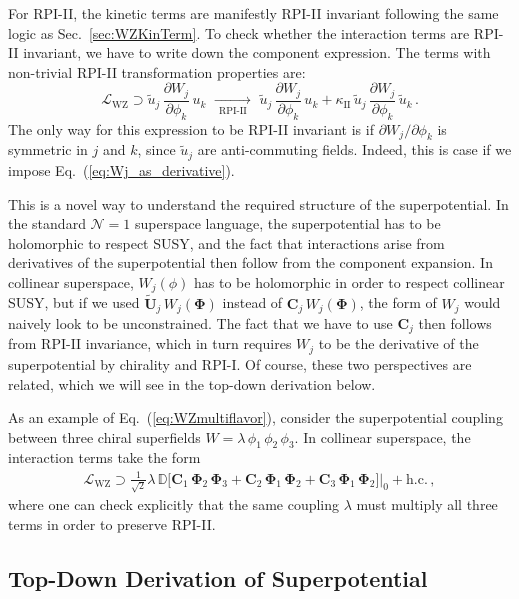 \documentclass[12pt,document,nofootinbib,superscriptaddress,onecolumn,preprintnumbers,balancelastpage]{article}
\newcommand{\rpiii}{{\kappa_\text{II}}}
\newcommand{\RPIii}{\,\,\xrightarrow[\hspace{5pt}\text{RPI-II}\hspace{5pt}]{}\,\,}
\DeclareRobustCommand{\Sec}[1]{Sec.~\ref{#1}}
\DeclareRobustCommand{\Eq}[1]{Eq.~(\ref{#1})}
\newcommand{\bPhi}{ \boldsymbol \Phi}
\newcommand{\bC}{ \boldsymbol C}
\newcommand{\bU}{ \tilde{\boldsymbol U}}
\newcommand{\D}{\mathbb{D}}
\newcommand{\uu}{\tilde u}
\begin{document}
\begin{spacing}{1.2}
For RPI-II, the kinetic terms are manifestly RPI-II invariant following the same logic as \Sec{sec:WZKinTerm}.
%
To check whether the interaction terms are RPI-II invariant, we have to write down the component expression.
%
The terms with non-trivial RPI-II transformation properties are:
%
\begin{equation}
\mathcal{L}_\text{WZ} \supset \uu_j \,\frac{\partial W_j}{\partial \phi_k}\, u_k  \RPIii  \uu_j \,\frac{\partial W_j}{\partial \phi_k}\, u_k + \rpiii \, \uu_j\,\frac{\partial W_j}{\partial \phi_k}\, \uu_k\,.
\end{equation}
%
The only way for this expression to be RPI-II invariant is if $\partial W_j/\partial \phi_k$ is symmetric in $j$ and $k$, since $\uu_j$ are anti-commuting fields.
%
Indeed, this is case if we impose \Eq{eq:Wj_as_derivative}.
%



This is a novel way to understand the required structure of the superpotential.
%
In the standard $\mathcal{N} = 1$ superspace language, the superpotential has to be holomorphic to respect SUSY, and the fact that interactions arise from derivatives of the superpotential then follow from the component expansion.
%
In collinear superspace, $W_j(\phi)$ has to be holomorphic in order to respect collinear SUSY, but if we used $\bU_j \, W_j(\bPhi)$ instead of $\bC_j  \, W_j(\bPhi)$, the form of $W_j$ would naively look to be unconstrained.
%
The fact that we have to use $\bC_j$ then follows from RPI-II invariance, which in turn requires $W_j$ to be the derivative of the superpotential by chirality and RPI-I.
%
Of course, these two perspectives are related, which we will see in the top-down derivation below.


As an example of \Eq{eq:WZmultiflavor}, consider the superpotential coupling between three chiral superfields $W = \lambda \,\phi_1\, \phi_2\, \phi_3$.
%
In collinear superspace, the interaction terms take the form
%
\begin{align}
\mathcal{L}_\text{WZ}  \supset  \frac{1}{\sqrt{2}} \lambda \, \D \bigg[  \bC_1\,   \bPhi_2\, \bPhi_3  + \bC_2 \,  \bPhi_1\, \bPhi_2 + \bC_3 \,  \bPhi_1\,\bPhi_2\bigg] \bigg|_{0} + \text{h.c.}\,,
\end{align}
%
where one can check explicitly that the same coupling $\lambda$ must multiply all three terms in order to preserve RPI-II.


\subsection{Top-Down Derivation of Superpotential}
\label{subsec:fulltheorymatchingSuperpotential}



\end{spacing}
\end{document}
